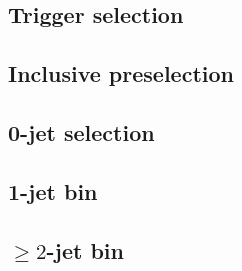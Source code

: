 
\subsection{Trigger selection}
\label{sec:selection:trigger}

\subsection{Inclusive preselection}
\label{sec:selection:presel}

\subsection{0-jet selection}
\label{sec:selection:0j}

\subsection{1-jet bin}
\label{sec:selection:1j}

\subsection{$\geq 2$-jet bin}
\label{sec:selection:2j}
